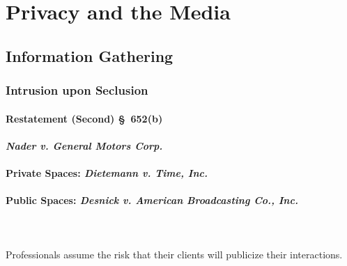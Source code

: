 \section{Privacy and the Media}

\subsection{Information Gathering}

\subsubsection{Intrusion upon Seclusion}

\paragraph{Restatement (Second) \S\ 652(b)}


\paragraph{\emph{Nader v. General Motors Corp.}}


\paragraph{Private Spaces: \emph{Dietemann v. Time, Inc.}}


\paragraph{Public Spaces: \emph{Desnick v. American Broadcasting Co., Inc.}}
~\\\\
Professionals assume the risk that their clients will publicize their interactions.

